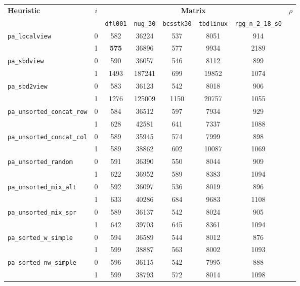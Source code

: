 \begin{table}[h]
	\centering
	\renewcommand{\arraystretch}{1.2}
	\begin{tabular}{|l|c||c|c|c|c|c||c|}
		\hline
		\multirow{2}{*}{\textbf{Heuristic}} & \multirow{2}{*}{$i$} &  \multicolumn{5}{|c||}{\textbf{Matrix}} & \multirow{2}{*}{$\rho$} \\ \cline{3-7}
		& & \texttt{dfl001} & \texttt{nug\_30} & \texttt{bcsstk30} & \texttt{tbdlinux} & \texttt{rgg\_n\_2\_18\_s0} & \\ \hline
		\verb|pa_localview| & 0 & 582 & 36224 & 537 & 8051 & 914  \\ %
		& 1 & \textbf{575} & 36896 & 577 & 9934 & 2189 \\ \hline %
		\verb|pa_sbdview| & 0 & 590 & 36057 & 546 & 8112 & 899 \\ %
		& 1 & 1493 & 187241 & 699 & 19852 & 1074 \\ \hline %
	\verb|pa_sbd2view| & 0 & 583 &  36123 & 542 & 8018 & 906 \\
		& 1 & 1276 & 125009 & 1150 & 20757 & 1055\\ \hline
		\verb|pa_unsorted_concat_row| & 0 & 584 & 36512 & 597 & 7934 & 929 \\ %
		& 1 & 628 & 42581 & 641 & 7337 & 1088 \\\hline
		\verb|pa_unsorted_concat_col| & 0 & 589 & 35945 & 574 & 7999 & 898 \\ %
		& 1 & 589 & 38862 & 602 & 10087 & 1069 \\\hline
		\verb|pa_unsorted_random| & 0 & 591 & 36390 & 550 & 8044 & 909 \\ %
		& 1 & 622 & 36952 & 589 & 8383 & 1094 \\ \hline
		\verb|pa_unsorted_mix_alt| & 0 & 592 & 36097 & 536 & 8019 & 896 \\ %
		& 1 &  633 & 40286 & 684 & 9683 & 1108 \\ \hline
		\verb|pa_unsorted_mix_spr| & 0 & 589 & 36137 & 542 & 8024 & 905 \\ %
		& 1 &  642 & 39703 & 645 & 8361 & 1094 \\ \hline
		\verb|pa_sorted_w_simple| & 0 & 594 & 36589 & 544 & 8012 & 876 \\ %
		& 1 &  599 & 38887 & 563 & 8002 & 1093 \\ \hline
		\verb|pa_sorted_nw_simple| & 0 & 596 & 36115 & 542 & 7995 & 888 \\ %
		& 1 &  599 & 38793 & 572 & 8014 & 1098 \\ \hline

\end{tabular}
\end{table}
